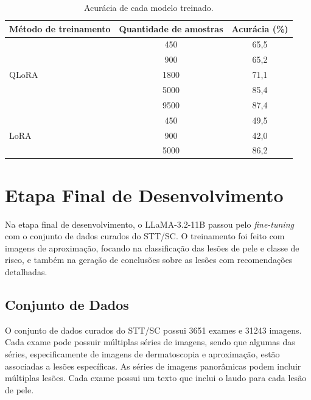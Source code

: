 \begin{table}[ht]
    \caption{\small Acurácia de cada modelo treinado.}
    \centering
    \begin{tabular}{l|c|c}
        \hline
        Método de treinamento       & Quantidade de amostras & Acurácia (\%) \\ \hline
        \multirow{5}{*}{\ac{QLoRA}} & 450                    & 65,5          \\
                                    & 900                    & 65,2          \\
                                    & 1800                   & 71,1          \\
                                    & 5000                   & 85,4          \\
                                    & 9500                   & 87,4          \\ \hline
        \multirow{3}{*}{\ac{LoRA}}  & 450                    & 49,5          \\
                                    & 900                    & 42,0          \\
                                    & 5000                   & 86,2          \\ \hline
    \end{tabular}
    \label{tab:training_accuracies}
\end{table}

\clearpage

\section{Etapa Final de Desenvolvimento}

Na etapa final de desenvolvimento, o \ac{LLaMA}-3.2-11B passou pelo \textit{fine-tuning} com o conjunto de dados
curados do \ac{STT/SC}. O treinamento foi feito com imagens de aproximação, focando na classificação das lesões de pele
e classe de risco, e também na geração de conclusões sobre as lesões com recomendações detalhadas.

\subsection{Conjunto de Dados}

O conjunto de dados curados do \ac{STT/SC} possui 3651 exames e 31243 imagens. Cada exame pode possuir múltiplas séries
de imagens, sendo que algumas das séries, especificamente de imagens de dermatoscopia e aproximação, estão associadas a
lesões específicas. As séries de imagens panorâmicas podem incluir múltiplas lesões. Cada exame possui um texto que
inclui o laudo para cada lesão de pele.

